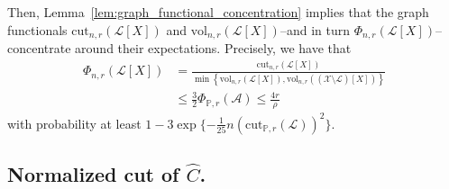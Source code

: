 \documentclass[11pt,twoside]{article}
\newcommand{\set}[1]{\left\{#1\right\}}
\newcommand{\vol}{\mathrm{vol}}
\newcommand{\cut}{\mathrm{cut}}
\newcommand{\1}{\mathbf{1}}
\newcommand{\Xbf}{X}             %
\newcommand{\Pbb}{\mathbb{P}}
\newcommand{\Aset}{\mathcal{A}}
\begin{document}
Then, Lemma~\ref{lem:graph_functional_concentration} implies that the graph functionals $\cut_{n,r}(\mathcal{L}[\Xbf])$ and $\vol_{n,r}(\mathcal{L}[\Xbf])$--and in turn $\Phi_{n,r}(\mathcal{L}[\Xbf])$-- concentrate around their expectations. Precisely, we have that 
\begin{align}
\Phi_{n,r}(\mathcal{L}[\Xbf]) & = \frac{\cut_{n,r}(\mathcal{L}[\Xbf])}{\min\set{\vol_{n,r}(\mathcal{L}[\Xbf]),\vol_{n,r}((\mathcal{X}\setminus\mathcal{L})[\Xbf])}} \nonumber \\
& \leq \frac{3}{2}\Phi_{\Pbb,r}(\Aset) \leq \frac{4 r}{\rho} \label{eqn:lb_pf2}
\end{align}
with probability at least $1 - 3\exp\{-\frac{1}{25}n(\cut_{\Pbb,r}(\mathcal{L}))^2\}$. 

\subsection{Normalized cut of $\widehat{C}$.}
\end{document}
